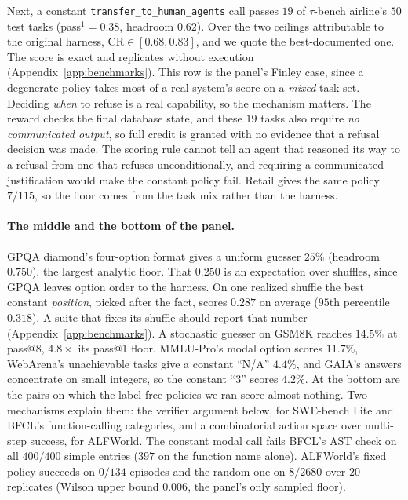 \documentclass{article}
\theoremstyle{plain}
\theoremstyle{definition}
\newcommand{\CR}{\mathrm{CR}}
\begin{document}
Next, a constant \texttt{transfer\_to\_human\_agents} call passes $19$ of $\tau$-bench airline's $50$ test tasks (pass$^{1} = 0.38$, headroom $0.62$). Over the two ceilings attributable to the original harness, $\CR \in [0.68, 0.83]$, and we quote the best-documented one. The score is exact and replicates without execution (Appendix~\ref{app:benchmarks}). This row is the panel's Finley case, since a degenerate policy takes most of a real system's score on a \emph{mixed} task set. Deciding \emph{when} to refuse is a real capability, so the mechanism matters. The reward checks the final database state, and these $19$ tasks also require \emph{no communicated output}, so full credit is granted with no evidence that a refusal decision was made. The scoring rule cannot tell an agent that reasoned its way to a refusal from one that refuses unconditionally, and requiring a communicated justification would make the constant policy fail. Retail gives the same policy $7/115$, so the floor comes from the task mix rather than the harness.

\paragraph{The middle and the bottom of the panel.}
GPQA diamond's four-option format gives a uniform guesser $25\%$ (headroom $0.750$), the largest analytic floor. That $0.250$ is an expectation over shuffles, since GPQA leaves option order to the harness. On one realized shuffle the best constant \emph{position}, picked after the fact, scores $0.287$ on average ($95$th percentile $0.318$). A suite that fixes its shuffle should report that number (Appendix~\ref{app:benchmarks}). A stochastic guesser on GSM8K reaches $14.5\%$ at pass@8, $4.8\times$ its pass@1 floor. MMLU-Pro's modal option scores $11.7\%$, WebArena's unachievable tasks give a constant ``N/A'' $4.4\%$, and GAIA's answers concentrate on small integers, so the constant ``3'' scores $4.2\%$. At the bottom are the pairs on which the label-free policies we ran score almost nothing. Two mechanisms explain them: the verifier argument below, for SWE-bench Lite and BFCL's function-calling categories, and a combinatorial action space over multi-step success, for ALFWorld. The constant modal call fails BFCL's AST check on all $400/400$ simple entries ($397$ on the function name alone). ALFWorld's fixed policy succeeds on $0/134$ episodes and the random one on $8/2680$ over $20$ replicates (Wilson upper bound $0.006$, the panel's only sampled floor).
\end{document}
